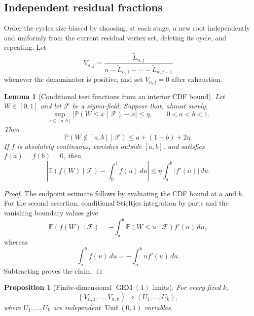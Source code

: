 \documentclass[11pt]{article}
\newtheorem{proposition}[theorem]{Proposition}
\newtheorem{lemma}[theorem]{Lemma}
\theoremstyle{remark}
\newcommand{\Pp}{\mathbb P}
\newcommand{\Ee}{\mathbb E}
\newcommand{\dd}{\,d}
\begin{document}
\subsection{Independent residual fractions}

Order the cycles size-biased by choosing, at each stage, a new root
independently and uniformly from the current residual vertex set, deleting its
cycle, and repeating.  Let
\[
 V_{n,j}=\frac{\widetilde L_{n,j}}
 {n-\widetilde L_{n,1}-\cdots-\widetilde L_{n,j-1}}
\]
whenever the denominator is positive, and set $V_{n,j}=0$ after exhaustion.

\begin{lemma}[Conditional test functions from an interior CDF bound]
\label{lem:pd-cdf-test}
Let $W\in[0,1]$ and let $\mathscr F$ be a sigma-field.  Suppose that, almost
surely,
\[
        \sup_{x\in[a,b]}
        |\Pp(W\le x\mid\mathscr F)-x|\le\eta,
        \qquad 0<a<b<1.
\]
Then
\[
        \Pp(W\notin[a,b]\mid\mathscr F)
        \le a+(1-b)+2\eta.
\]
If $f$ is absolutely continuous, vanishes outside $[a,b]$, and satisfies
$f(a)=f(b)=0$, then
\[
 \left|\Ee(f(W)\mid\mathscr F)-\int_0^1f(u)\dd u\right|
 \le\eta\int_a^b|f'(u)|\dd u.
\]
\end{lemma}

\begin{proof}
The endpoint estimate follows by evaluating the CDF bound at $a$ and $b$.
For the second assertion, conditional Stieltjes integration by parts and the
vanishing boundary values give
\[
        \Ee(f(W)\mid\mathscr F)
        =-\int_a^b\Pp(W\le u\mid\mathscr F)f'(u)\dd u,
\]
whereas
\[
        \int_a^bf(u)\dd u=-\int_a^bu f'(u)\dd u.
\]
Subtracting proves the claim.
\end{proof}

\begin{proposition}[Finite-dimensional $\operatorname{GEM}(1)$ limits]
\label{prop:pd-residual-uniforms}
For every fixed $k$,
\[
        (V_{n,1},\ldots,V_{n,k})
        \Rightarrow(U_1,\ldots,U_k),
\]
where $U_1,\ldots,U_k$ are independent $\operatorname{Unif}(0,1)$ variables.
\end{proposition}
\end{document}
